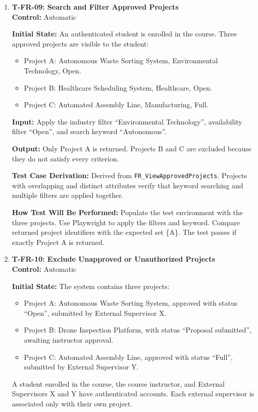 \documentclass[12pt, titlepage]{article}
\begin{document}
\begin{enumerate}

\item \label{T-FR-09}\textbf{T-FR-09: Search and Filter Approved Projects}\\

\textbf{Control:} Automatic

\textbf{Initial State:} An authenticated student is enrolled in the course. Three approved projects are visible to the student:
\begin{itemize}
    \item Project A: Autonomous Waste Sorting System, Environmental Technology, Open.
    \item Project B: Healthcare Scheduling System, Healthcare, Open.
    \item Project C: Automated Assembly Line, Manufacturing, Full.
\end{itemize}

\textbf{Input:} Apply the industry filter ``Environmental Technology'', availability filter ``Open'', and search keyword ``Autonomous''.

\textbf{Output:} Only Project A is returned. Projects B and C are excluded because they do not satisfy every criterion.

\textbf{Test Case Derivation:} Derived from \texttt{FR\_ViewApprovedProjects}. Projects with overlapping and distinct attributes verify that keyword searching and multiple filters are applied together.

\textbf{How Test Will Be Performed:} Populate the test environment with the three projects. Use Playwright to apply the filters and keyword. Compare returned project identifiers with the expected set \{A\}. The test passes if exactly Project A is returned.

\item \label{T-FR-10}\textbf{T-FR-10: Exclude Unapproved or Unauthorized Projects}\\

\textbf{Control:} Automatic

\textbf{Initial State:} The system contains three projects:
\begin{itemize}
    \item Project A: Autonomous Waste Sorting System, approved with status ``Open'', submitted by External Supervisor X.
    \item Project B: Drone Inspection Platform, with status ``Proposal submitted'', awaiting instructor approval.
    \item Project C: Automated Assembly Line, approved with status ``Full'', submitted by External Supervisor Y.
\end{itemize}
A student enrolled in the course, the course instructor, and External Supervisors X and Y have authenticated accounts. Each external supervisor is associated only with their own project.


\end{enumerate}
\end{document}
